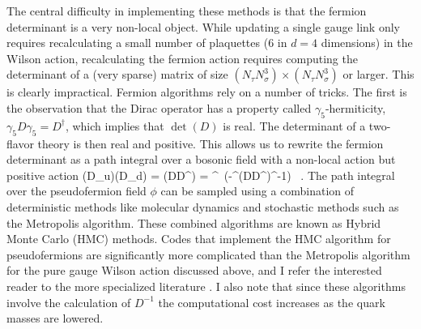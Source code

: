  The central difficulty in implementing these methods is that the 
fermion determinant is a very non-local object. While updating a
single gauge link only requires recalculating a small number of 
plaquettes (6 in $d=4$ dimensions) in the Wilson action, recalculating
the fermion action requires computing the determinant of a (very sparse) 
matrix of size $(N_\tau N_\sigma^3)\times(N_\tau N_\sigma^3)$ or larger. 
This is clearly impractical. Fermion algorithms rely on a number of 
tricks. The first is the observation that the Dirac operator has a 
property called $\gamma_5$-hermiticity, $\gamma_5 D\gamma_5=D^\dagger$,
which implies that $\det(D)$ is real. The determinant of a two-flavor 
theory is then real and positive. This allows us to rewrite the 
fermion determinant as a path integral over a bosonic field with a 
non-local action but positive action
\be 
\det(D_u)\det(D_d) = 
\det(DD^\dagger) = \phi^\dagger\, 
  \exp(-\phi^\dagger (DD^\dagger)^{-1}\phi) \, . 
\ee
The path integral over the pseudofermion field $\phi$ can be sampled 
using a combination of deterministic methods like molecular dynamics 
and stochastic methods such as the Metropolis algorithm. These combined 
algorithms are known as Hybrid Monte Carlo (HMC) methods. Codes that
implement the HMC algorithm for pseudofermions are significantly
more complicated than the Metropolis algorithm for the pure gauge
Wilson action discussed above, and I refer the interested reader 
to the more specialized literature \cite{Luscher:2010ae}. I also
note that since these algorithms involve the calculation of $D^{-1}$
the computational cost increases as the quark masses are lowered. 

